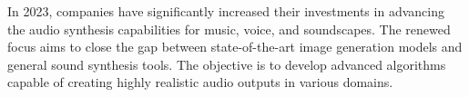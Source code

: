 In 2023, companies have significantly increased their investments in advancing the audio synthesis capabilities for music, voice, and soundscapes. The renewed focus aims to close the gap between state-of-the-art image generation models and general sound synthesis tools. The objective is to develop advanced algorithms capable of creating highly realistic audio outputs in various domains.